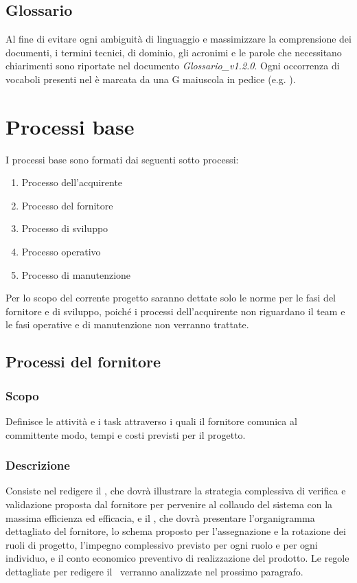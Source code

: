 \documentclass[12pt,a4paper]{article}
\begin{document}
\subsection{Glossario}
Al fine di evitare ogni ambiguità di linguaggio e massimizzare la comprensione dei
documenti, i termini tecnici, di dominio, gli acronimi e le parole che necessitano chiarimenti sono riportate nel documento \emph{Glossario\_v1.2.0}. Ogni occorrenza di vocaboli presenti nel \GlO è marcata da una G maiuscola in pedice (e.g. ).

\newpage

\section{Processi base} %
I processi base sono formati dai seguenti sotto processi:
\begin{enumerate}
\item Processo dell’acquirente
\item Processo del fornitore
\item Processo di sviluppo
\item Processo operativo
\item Processo di manutenzione
\end{enumerate}
Per lo scopo del corrente progetto saranno dettate solo le norme per le fasi del fornitore e di sviluppo, poiché i processi  dell’acquirente non riguardano il team e le fasi operative e di manutenzione non verranno trattate.

\subsection{Processi del fornitore}

\subsubsection{Scopo}
Definisce le attività e i task attraverso i quali il fornitore comunica al committente modo, tempi e costi previsti per il progetto.

\subsubsection{Descrizione}
Consiste nel redigere il \PdQ, che dovrà illustrare la strategia complessiva di verifica e validazione proposta dal fornitore per pervenire al collaudo del sistema con la massima efficienza ed efficacia, e il \PdP, che dovrà presentare l'organigramma dettagliato del fornitore, lo schema proposto per l'assegnazione e la rotazione dei ruoli di progetto, l'impegno complessivo previsto per ogni ruolo e per ogni individuo, e il conto economico preventivo di realizzazione del prodotto. Le regole dettagliate per redigere il \PdP\ verranno analizzate nel prossimo paragrafo.
\end{document}
